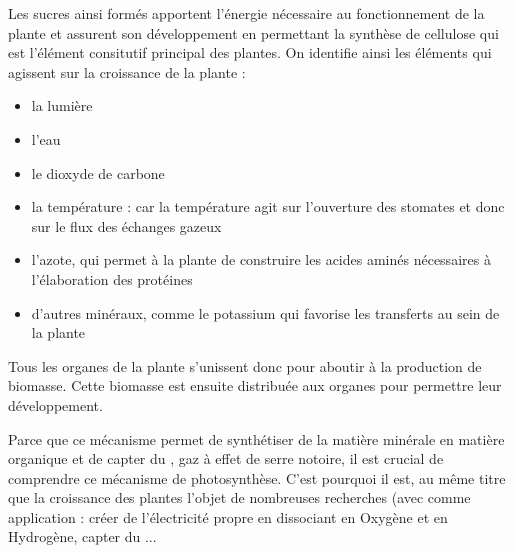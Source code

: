 Les sucres ainsi formés apportent l'énergie nécessaire au fonctionnement de la plante et assurent son développement en permettant la synthèse de cellulose qui est l'élément consitutif principal des plantes.
On identifie ainsi les éléments qui agissent sur la croissance de la plante : 
\begin{itemize}
	\item la lumière
	\item l'eau
	\item le dioxyde de carbone
	\item la température : car la température agit sur l'ouverture des stomates et donc sur le flux des échanges gazeux
	\item l'azote, qui permet à la plante de construire les acides aminés nécessaires à l'élaboration des protéines
	\item d'autres minéraux, comme le potassium qui favorise les transferts au sein de la plante
\end{itemize}

Tous les organes de la plante s'unissent donc pour aboutir à la production de biomasse. Cette biomasse est ensuite distribuée aux organes pour permettre leur développement.

Parce que ce mécanisme permet de synthétiser de la matière minérale en matière organique et de capter du , gaz à effet de serre notoire, il est crucial de comprendre ce mécanisme de photosynthèse. C'est pourquoi il est, au même titre que la croissance des plantes l'objet de nombreuses recherches (avec comme application : créer de l'électricité propre en dissociant  en Oxygène et en Hydrogène, capter du ...

	
